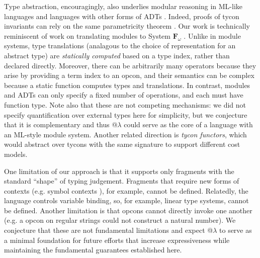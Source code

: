 \documentclass[10pt,preprint]{sigplanconf}
\begin{document}
Type abstraction, encouragingly, also underlies modular reasoning in ML-like languages \cite{pfpl,harper1997programming,conf/oopsla/AminRO14} and languages with other forms of ADTs \cite{liskov1974programming}. Indeed, proofs of tycon invariants can rely on the same parametricity theorem \cite{WadlerThms}. Our work is technically reminiscent of  work on  translating modules to System $\mathbf{F}_\omega$ \cite{conf/tldi/RossbergRD10}.  Unlike in module systems, type translations (analagous to the choice of representation for an abstract type) are \emph{statically computed} based on a type index, rather than declared directly. Moreover, there can be arbitrarily many operators because they arise by providing a term index to an opcon, and their  semantics can be complex because a static function computes types and translations. In contrast, modules and ADTs can only specify a fixed number of operations, and each must have function type. Note also that these are not competing mechanisms: we did not specify quantification over external types here for simplicity, but we conjecture that it is complementary and thus @$\lambda$ could serve as the core of a language with an ML-style module system. Another related direction is \emph{tycon functors}, which would abstract over tycons with the same signature to support  different cost models. %

One limitation of our approach is that it supports only  fragments with the standard ``shape'' of typing judgement. Fragments that require new forms of contexts (e.g. symbol contexts \cite{pfpl}), for example, cannot be defined. Relatedly, the language controls variable binding, so, for example, linear type systems, cannot be defined. Another limitation is that opcons cannot directly invoke one another (e.g. a  opcon on regular strings could not construct a natural number). We conjecture that these are not fundamental limitations and expect @$\lambda$ to serve as a minimal foundation for future efforts that increase  expressiveness while maintaining the fundamental guarantees established  here. %



\end{document}
